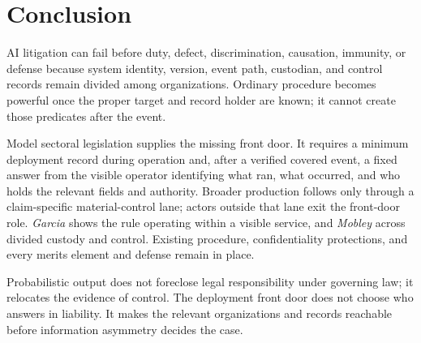 \section*{Conclusion}
AI litigation can fail before duty, defect, discrimination, causation, immunity, or defense because system identity, version, event path, custodian, and control records remain divided among organizations. Ordinary procedure becomes powerful once the proper target and record holder are known; it cannot create those predicates after the event.

Model sectoral legislation supplies the missing front door. It requires a minimum deployment record during operation and, after a verified covered event, a fixed answer from the visible operator identifying what ran, what occurred, and who holds the relevant fields and authority. Broader production follows only through a claim-specific material-control lane; actors outside that lane exit the front-door role. \emph{Garcia} shows the rule operating within a visible service, and \emph{Mobley} across divided custody and control. Existing procedure, confidentiality protections, and every merits element and defense remain in place.

Probabilistic output does not foreclose legal responsibility under governing law; it relocates the evidence of control. The deployment front door does not choose who answers in liability. It makes the relevant organizations and records reachable before information asymmetry decides the case.
